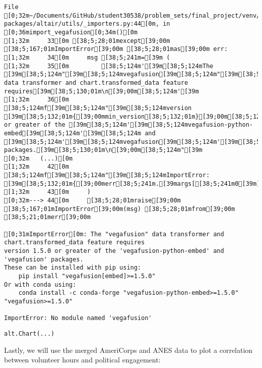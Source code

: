 \documentclass[
  letterpaper,
  DIV=11,
  numbers=noendperiod]{scrartcl}
\begin{document}
\begin{verbatim}
File [0;32m~/Documents/GitHub/student30538/problem_sets/final_project/venv/lib/python3.13/site-packages/altair/utils/_importers.py:44[0m, in [0;36mimport_vegafusion[0;34m()[0m
[1;32m     33[0m [38;5;28;01mexcept[39;00m [38;5;167;01mImportError[39;00m [38;5;28;01mas[39;00m err:
[1;32m     34[0m     msg [38;5;241m=[39m (
[1;32m     35[0m         [38;5;124m'[39m[38;5;124mThe [39m[38;5;124m"[39m[38;5;124mvegafusion[39m[38;5;124m"[39m[38;5;124m data transformer and chart.transformed_data feature requires[39m[38;5;130;01m\n[39;00m[38;5;124m'[39m
[1;32m     36[0m         [38;5;124mf[39m[38;5;124m"[39m[38;5;124mversion [39m[38;5;132;01m{[39;00mmin_version[38;5;132;01m}[39;00m[38;5;124m or greater of the [39m[38;5;124m'[39m[38;5;124mvegafusion-python-embed[39m[38;5;124m'[39m[38;5;124m and [39m[38;5;124m'[39m[38;5;124mvegafusion[39m[38;5;124m'[39m[38;5;124m packages.[39m[38;5;130;01m\n[39;00m[38;5;124m"[39m
[0;32m   (...)[0m
[1;32m     42[0m         [38;5;124mf[39m[38;5;124m"[39m[38;5;124mImportError: [39m[38;5;132;01m{[39;00merr[38;5;241m.[39margs[[38;5;241m0[39m][38;5;132;01m}[39;00m[38;5;124m"[39m
[1;32m     43[0m     )
[0;32m---> 44[0m     [38;5;28;01mraise[39;00m [38;5;167;01mImportError[39;00m(msg) [38;5;28;01mfrom[39;00m [38;5;21;01merr[39;00m

[0;31mImportError[0m: The "vegafusion" data transformer and chart.transformed_data feature requires
version 1.5.0 or greater of the 'vegafusion-python-embed' and 'vegafusion' packages.
These can be installed with pip using:
    pip install "vegafusion[embed]>=1.5.0"
Or with conda using:
    conda install -c conda-forge "vegafusion-python-embed>=1.5.0" "vegafusion>=1.5.0"

ImportError: No module named 'vegafusion'
\end{verbatim}

\begin{verbatim}
alt.Chart(...)
\end{verbatim}

Lastly, we will use the merged AmeriCorps and ANES data to plot a
correlation between volunteer hours and political engagement:
\end{document}
